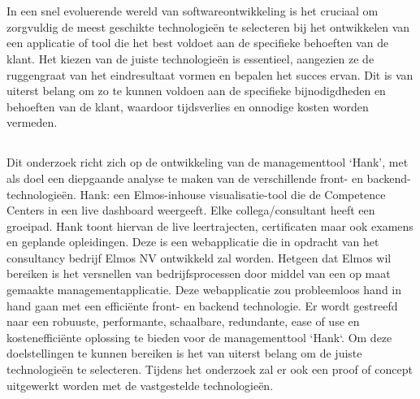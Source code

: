 
\chapter{}%
\label{ch:inleiding}
In een snel evoluerende wereld van softwareontwikkeling is het cruciaal om
zorgvuldig de meest geschikte technologieën te selecteren bij het ontwikkelen
van een applicatie of tool die het best voldoet aan de specifieke behoeften van
de klant. Het kiezen van de juiste technologieën is essentieel, aangezien ze de
ruggengraat van het eindresultaat vormen en bepalen het succes ervan. Dit is
van uiterst belang om zo te kunnen voldoen aan de specifieke bijnodigdheden en
behoeften van de klant, waardoor tijdsverlies en onnodige kosten worden
vermeden.
\section{}%
\label{sec:probleemstelling}
Dit onderzoek richt zich op de ontwikkeling van de managementtool `Hank', met
als doel een diepgaande analyse te maken van de verschillende front- en
backend-technologieën. Hank: een Elmos-inhouse visualisatie-tool die de
Competence Centers in een live dashboard weergeeft. Elke collega/consultant
heeft een groeipad. Hank toont hiervan de live leertrajecten,
cer\-ti\-fi\-caten maar ook ex\-amens en geplande opleidingen. Deze is een
webapplicatie die in opdracht van het consultancy bedrijf Elmos NV ontwikkeld
zal worden. Hetgeen dat Elmos wil bereiken is het versnellen van
bedrijfsprocessen door middel van een op maat gemaakte managementapplicatie.
Deze webapplicatie zou probleemloos hand in hand gaan met een efficiënte front-
en backend technologie. \bigbreak Er wordt gestreefd naar een robuuste,
performante, schaalbare, redundante, ease of use en kostenefficiënte oplossing
te bieden voor de managementtool `Hank`. Om deze doelstellingen te kunnen
bereiken is het van uiterst belang om de juiste technologieën te selecteren.
Tijdens het onderzoek zal er ook een proof of concept uitgewerkt worden met de
vastgestelde technologieën.

\section{}%
\label{sec:onderzoeksvraag}

